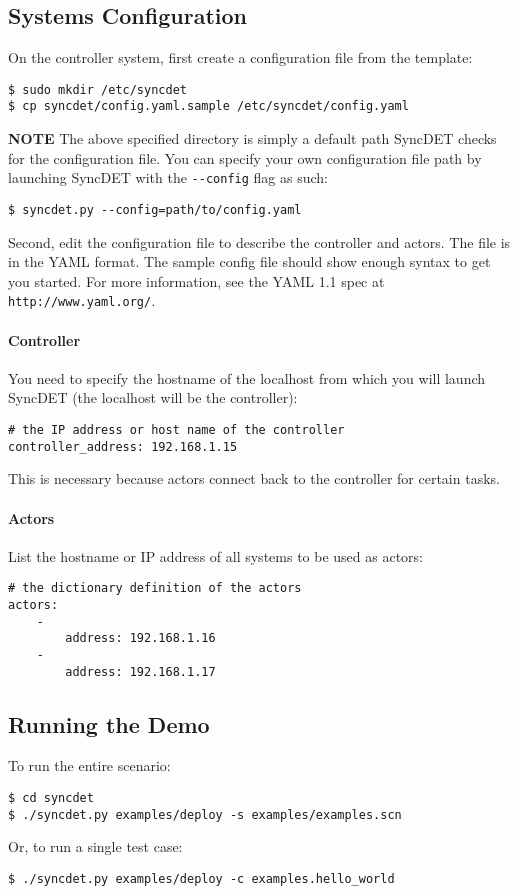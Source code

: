 \subsection{Systems Configuration}
On the controller system, first create a configuration file from the template:
\begin{verbatim}
$ sudo mkdir /etc/syncdet
$ cp syncdet/config.yaml.sample /etc/syncdet/config.yaml
\end{verbatim}

\textbf{NOTE} The above specified directory is simply a default path SyncDET checks for the
configuration file. You can specify your own configuration file path
by launching SyncDET with the \verb+--config+ flag as such:
\begin{verbatim}
$ syncdet.py --config=path/to/config.yaml
\end{verbatim}

Second, edit the configuration file to describe the controller and actors. The file is
in the YAML format. The sample config file should show enough syntax to get you started.
For more information, see the YAML 1.1 spec at \verb+http://www.yaml.org/+.

\paragraph{Controller}
You need to specify the hostname of the localhost from which you will launch
SyncDET (the localhost will be the controller):
\begin{verbatim}
# the IP address or host name of the controller
controller_address: 192.168.1.15
\end{verbatim}
This is necessary because actors connect back to the controller for certain tasks.

\paragraph{Actors}
List the hostname or IP address of all systems to be used as actors:
\begin{verbatim}
# the dictionary definition of the actors
actors:
    -
        address: 192.168.1.16
    -
        address: 192.168.1.17
\end{verbatim}

\subsection{Running the Demo}

To run the entire scenario:
\begin{verbatim}
$ cd syncdet
$ ./syncdet.py examples/deploy -s examples/examples.scn
\end{verbatim}

Or, to run a single test case:
\begin{verbatim}
$ ./syncdet.py examples/deploy -c examples.hello_world
\end{verbatim}
